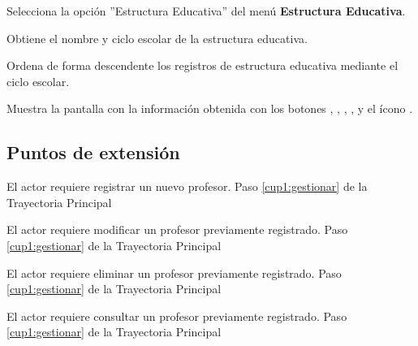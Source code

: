 \begin{UCtrayectoria}
	
	\UCpaso [\UCactor] Selecciona la opción ''Estructura Educativa'' del menú \textbf{Estructura Educativa}.
	
	\UCpaso [\UCsist] Obtiene el nombre y ciclo escolar de la estructura educativa.
	
	\UCpaso [\UCsist] Ordena de forma descendente los registros de estructura educativa mediante el ciclo escolar.
	
	\UCpaso[\UCsist] Muestra la pantalla  con la información obtenida con los botones , , , ,  y el ícono \btnRegistrar. \label{cuee1:gestionar}
\end{UCtrayectoria}

\subsection{Puntos de extensión}

\UCExtensionPoint 
{El actor requiere registrar un nuevo profesor.}
{Paso \ref{cup1:gestionar} de la Trayectoria Principal}
{}

\UCExtensionPoint 
{El actor requiere modificar un profesor previamente registrado.}
{Paso \ref{cup1:gestionar} de la Trayectoria Principal}
{}

\UCExtensionPoint 
{El actor requiere eliminar un profesor previamente registrado.}
{Paso \ref{cup1:gestionar} de la Trayectoria Principal}
{}

\UCExtensionPoint 
{El actor requiere consultar un profesor previamente registrado.}
{Paso \ref{cup1:gestionar} de la Trayectoria Principal}
{}


